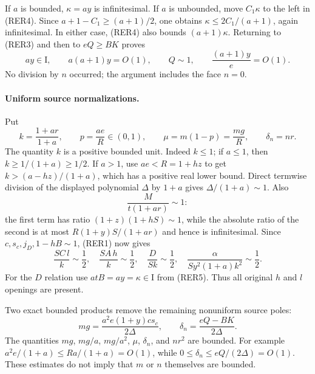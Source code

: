 If $a$ is bounded, $\kappa=ay$ is infinitesimal.  If $a$ is unbounded,
move $C_1\kappa$ to the left in (RER4).  Since
$a+1-C_1\geq(a+1)/2$, one obtains
$\kappa\leq2C_1/(a+1)$, again infinitesimal.  In either case,
(RER4) also bounds $(a+1)\kappa$.  Returning to (RER3) and then to
$eQ\geq BK$ proves
\[
 ay\in\mathrm I,\qquad a(a+1)y=O(1),\qquad Q\sim1,
 \qquad \frac{(a+1)y}{e}=O(1).                         \tag{RER5}
\]
No division by $n$ occurred; the argument includes the face $n=0$.

\paragraph{Uniform source normalizations.}
Put
\[
 k=\frac{1+ar}{1+a},\qquad p=\frac{ae}{R}\in(0,1),
 \qquad \mu=m(1-p)=\frac{mg}{R},\qquad\delta_n=nr.
\]
The quantity $k$ is a positive bounded unit.  Indeed $k\leq1$; if
$a\leq1$, then $k\geq1/(1+a)\geq1/2$.  If $a>1$, use
$ae<R=1+hz$ to get $k>(a-hz)/(1+a)$, which has a positive real lower
bound.  Direct termwise division of the displayed polynomial
$\Delta$ by $1+a$ gives $\Delta/(1+a)\sim1$.  Also
\[
 \frac{M}{t(1+ar)}\sim1:
\]
the first term has ratio $(1+z)(1+hS)\sim1$, while the absolute
ratio of the second is at most $R(1+y)S/(1+ar)$ and hence is
infinitesimal.  Since $c,s_c,j_D,1-hB\sim1$, (RER1) now gives
\[
 \frac{SC\,l}{k}\sim\frac12,\quad
 \frac{SA\,h}{k}\sim\frac12,\quad
 \frac{D}{Sk}\sim\frac12,\quad
 \frac{\alpha}{Sy^2(1+a)k^2}\sim\frac12.               \tag{RER6}
\]
For the $D$ relation use $atB=ay=\kappa\in\mathrm I$ from
(RER5).  Thus all original $h$ and $l$ openings are present.

Two exact bounded products remove the remaining nonuniform source
poles:
\[
 mg=\frac{a^2e(1+y)c s_c}{2\Delta},\qquad
 \delta_n=\frac{eQ-BK}{2\Delta}.                       \tag{RER7}
\]
The quantities $mg$, $mg/a$, $mg/a^2$, $\mu$, $\delta_n$, and
$nr^2$ are bounded.  For example
$a^2e/(1+a)\leq R a/(1+a)=O(1)$, while
$0\leq\delta_n\leq eQ/(2\Delta)=O(1)$.
These estimates do not imply that $m$ or $n$ themselves are bounded.

